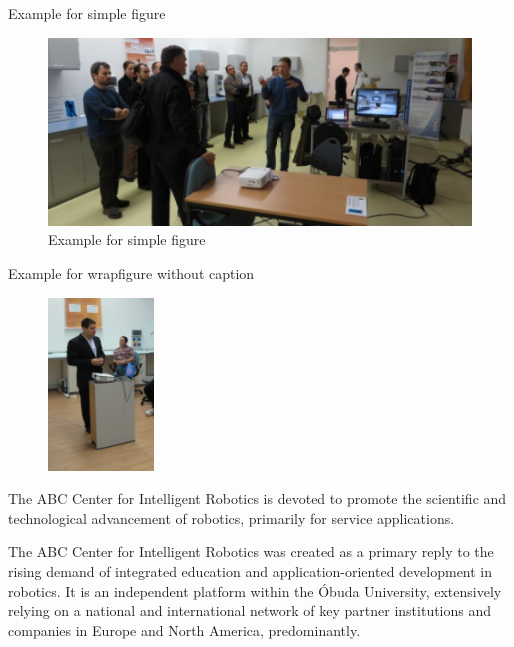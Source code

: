 \documentclass[aspectratio=169]{beamer}
\begin{document}
	\begin{frame}{Example for simple figure}
		
		\begin{figure}
		\centering
		\includegraphics[width=\linewidth]{img/example_fig_1}
		\caption{Example for simple figure}
		\label{fig:example_fig_1}
		\end{figure}

	\end{frame}
	
	\begin{frame}{Example for wrapfigure without caption}
		
		\begin{figure} %
			\vspace{-20pt}
			\begin{center}
				\includegraphics[width=0.25\textwidth]{img/example_fig_2}
				\label{fig:example_fig_2}
			\end{center}
			\vspace{-20pt}
			\vspace{1pt}
		\end{figure} 
		The ABC Center for Intelligent Robotics is devoted to promote the scientific and technological advancement of robotics, primarily for service applications.
		
		\vspace*{2mm}
		
		The ABC Center for Intelligent Robotics was created as a primary reply to the rising demand of integrated education and application-oriented development in robotics. It is an independent platform within the Óbuda University, extensively relying on a national and international network of key partner institutions and companies in Europe and North America, predominantly.

	\end{frame}
	
\end{document}
